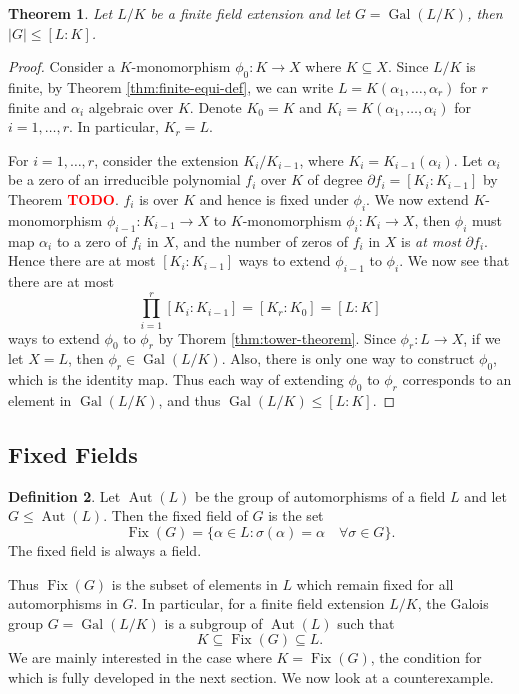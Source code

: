 \documentclass[12pt]{article}
\newtheorem{theorem}{Theorem}
\theoremstyle{definition}
\newtheorem{definition}[theorem]{Definition}
\newcommand{\Gal}{\operatorname{Gal}}
\newcommand{\Aut}{\operatorname{Aut}}
\newcommand{\Fix}{\operatorname{Fix}}
\newcommand{\TODO}{\textbf{\textcolor{red}{TODO}}}
\begin{document}

\begin{theorem} \label{thm:galois-group-order-upper-bound}
    Let $L/K$ be a finite field extension and let $G = \Gal(L/K)$, then $|G| \le [L:K]$. 
\end{theorem}

\begin{proof}
    Consider a $K$-monomorphism $\phi_0 : K \to X$ where $K \subseteq X$. Since $L/K$ is finite, by Theorem \ref{thm:finite-equi-def}, we can write $L = K(\alpha_1, \ldots, \alpha_r)$ for $r$ finite and $\alpha_i$ algebraic over $K$. Denote $K_0 = K$ and
    $K_i = K(\alpha_1, \dots, \alpha_i)$ for $i = 1, \ldots, r$. In particular, $K_r = L$. 


    For $i = 1, \ldots, r$, consider the extension $K_i / K_{i-1}$, where $K_i = K_{i-1} (\alpha_i)$. Let $\alpha_i$ be a zero of an irreducible polynomial $f_i$ over $K$ of degree $\partial f_i = [K_i : K_{i-1}]$ by Theorem \TODO. $f_i$ is over $K$ and hence is fixed under $\phi_i$. We now extend $K$-monomorphism $\phi_{i-1} : K_{i-1} \to X$ to $K$-monomorphism $\phi_i: K_i \to X$, then $\phi_i$ must map $\alpha_i$ to a zero of $f_i$ in $X$, and the number of zeros of $f_i$ in $X$ is \textit{at most} $\partial f_i$. Hence there are at most $[K_i : K_{i-1}]$ ways to extend $\phi_{i-1}$ to $\phi_i$. We now see that there are at most $$\prod_{i=1} ^r [K_i : K_{i-1}] = [K_r : K_0] = [L : K]$$ ways to extend $\phi_0$ to $\phi_r$ by Thorem \ref{thm:tower-theorem}. Since $\phi_r : L \to X$, if we let $X = L$, then $\phi_r \in \Gal(L/K)$. Also, there is only one way to construct $\phi_0$, which is the identity map. Thus each way of extending $\phi_0$ to $\phi_r$ corresponds to an element in $\Gal(L/K)$, and thus $\Gal(L/K) \le [L:K]$. 
\end{proof}
\cite{galois-theory-lectures}


\subsection{Fixed Fields}

\begin{definition}
    Let $\Aut(L)$ be the group of automorphisms of a field $L$ and let $G \leq \Aut(L)$. Then the fixed field of $G$ is the set $$\Fix(G) = \{ \alpha \in L : \sigma(\alpha) = \alpha \quad \forall \sigma \in G \}. $$ The fixed field is always a field.
\end{definition}
Thus $\Fix(G)$ is the subset of elements in $L$ which remain fixed for all automorphisms in $G$. In particular, for a finite field extension $L/ K$, the Galois group $G = \Gal(L / K)$ is a subgroup of $\Aut(L)$ such that $$K \subseteq \Fix(G) \subseteq L. $$ We are mainly interested in the case where $K = \Fix(G)$, the condition for which is fully developed in the next section. We now look at a counterexample. 
\end{document}
